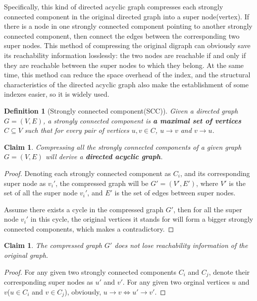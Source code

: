 \documentclass[11pt]{article}
\newtheorem{definition}[theorem]{Definition}
\newtheorem{claim}[theorem]{Claim}
\begin{document}
Specifically, this kind of directed acyclic graph compresses each strongly connected component in the original directed graph into a super node(vertex). If there is a node in one strongly connected component pointing to another strongly connected component, then connect the edges between the corresponding two super nodes. This method of compressing the original digraph can obviously save its reachability information losslessly: the two nodes are reachable if and only if they are reachable between the super nodes to which they belong.  At the same time, this method can reduce the space overhead of the index, and the structural characteristics of the directed acyclic graph also make the establishment of some indexes easier, so it is widely used.

\begin{definition} 	[Strongly connected component(SCC)] 	Given a directed graph $G=(V,E)$, a strongly connected component is \textbf{a maximal set of vertices $C\subseteq{V}$} such that for every pair of vertices $u,v\in{C}$, $u\rightarrow v$ and $v\rightarrow u$.
\end{definition}
\begin{claim}
	Compressing all the strongly connected components of a given graph $G=(V,E)$ will derive a \textbf{directed acyclic graph}.
\end{claim}
\begin{proof}
	Denoting each strongly connected component as $C_i$, and its corresponding super node as $v_i'$, the compressed graph will be $G'=(V',E')$, where $V'$ is the set of all the super node $v_i'$, and $E'$ is the set of edges between super nodes.
	
	Assume there exists a cycle in the compressed graph $G'$, then for all the super node $v_i'$ in this cycle, the original vertices it stands for will form a bigger strongly connected components, which makes a contradictory.
\end{proof}
\begin{claim}
	The compressed graph $G'$ does not lose reachability information of the original graph.
\end{claim}
\begin{proof}
	For any given two strongly connected components $C_i$ and $C_j$, denote their corresponding super nodes as $u'$ and $v'$. For any given two orginal vertices $u$ and $v$($u\in{C_i}$ and $v\in{C_j}$), obviously, $u\rightarrow v \Leftrightarrow u'\rightarrow v'$.
\end{proof}
\end{document}
